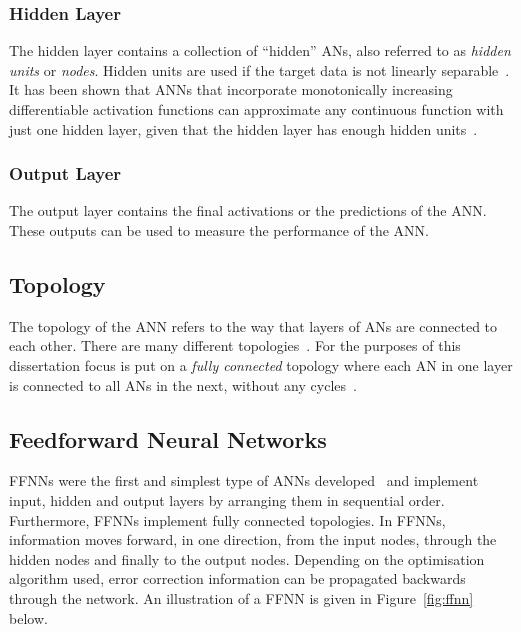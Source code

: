 \subsubsection{Hidden Layer}\label{sec:anns:anns:architecture:hidden}

The hidden layer contains a collection of ``hidden'' \acp{AN}, also referred to as \textit{hidden units} or \textit{nodes}. Hidden units are used if the target data is not linearly separable~\cite{ref:engelbrecht:2007}. It has been shown that \acp{ANN} that incorporate monotonically increasing differentiable activation functions can approximate any continuous function with just one hidden layer, given that the hidden layer has enough hidden units~\cite{ref:hornik:1989}.

\subsubsection{Output Layer}\label{sec:anns:anns:architecture:output}

The output layer contains the final activations or the predictions of the \acs{ANN}. These outputs can be used to measure the performance of the \acs{ANN}.


\subsection{Topology}
\label{sec:anns:anns:topology}

The topology of the \acs{ANN} refers to the way that layers of \acp{AN} are connected to each other. There are many different topologies~\cite{ref:miikkulainen:2010}. For the purposes of this dissertation focus is put on a \textit{fully connected} topology where each \acs{AN} in one layer is connected to all \acp{AN} in the next, without any cycles~\cite{ref:zell:1994}.


\subsection{Feedforward Neural Networks}\label{sec:anns:anns:ffnns}

\acp{FFNN} were the first and simplest type of \acp{ANN} developed~\cite{ref:schmidhuber:2015} and implement input, hidden and output layers by arranging them in sequential order. Furthermore, \acp{FFNN} implement fully connected topologies. In \acp{FFNN}, information moves forward, in one direction, from the input nodes, through the hidden nodes and finally to the output nodes. Depending on the optimisation algorithm used, error correction information can be propagated backwards through the network. An illustration of a \acs{FFNN} is given in Figure~\ref{fig:ffnn} below.

